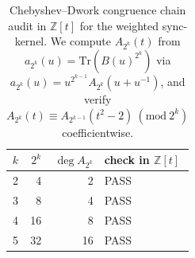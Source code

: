 \begin{table}[H]
\centering
\scriptsize
\setlength{\tabcolsep}{6pt}
\caption{Chebyshev--Dwork congruence chain audit in $\mathbb{Z}[t]$ for the weighted sync-kernel. We compute $A_{2^k}(t)$ from $a_{2^k}(u)=\mathrm{Tr}(B(u)^{2^k})$ via $a_{2^k}(u)=u^{2^{k-1}}A_{2^k}(u+u^{-1})$, and verify $A_{2^k}(t)\equiv A_{2^{k-1}}(t^2-2)\ (\mathrm{mod}\ 2^k)$ coefficientwise.}
\label{tab:sync_kernel_weighted_chebyshev_dwork_chain}
\begin{tabular}{r r r l}
\toprule
$k$ & $2^k$ & $\deg A_{2^k}$ & check in $\mathbb{Z}[t]$\\
\midrule
2 & 4 & 2 & PASS\\
3 & 8 & 4 & PASS\\
4 & 16 & 8 & PASS\\
5 & 32 & 16 & PASS\\
\bottomrule
\end{tabular}
\end{table}
